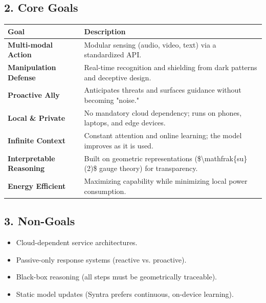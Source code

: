 \documentclass[12pt,a4paper]{article}
\providecommand{\tightlist}{\setlength{\itemsep}{0pt}\setlength{\parskip}{0pt}}
\begin{document}
\subsection{2. Core Goals}\label{core-goals}

{\def\LTcaptype{none} %
\begin{longtable}[]{@{}ll@{}}
\toprule\noalign{}
Goal & Description \\
\midrule\noalign{}
\endhead
\bottomrule\noalign{}
\endlastfoot
\textbf{Multi-modal Action} & Modular sensing (audio, video, text) via a
standardized API. \\
\textbf{Manipulation Defense} & Real-time recognition and shielding from
dark patterns and deceptive design. \\
\textbf{Proactive Ally} & Anticipates threats and surfaces guidance
without becoming "noise." \\
\textbf{Local \& Private} & No mandatory cloud dependency; runs on
phones, laptops, and edge devices. \\
\textbf{Infinite Context} & Constant attention and online learning; the
model improves as it is used. \\
\textbf{Interpretable Reasoning} & Built on geometric representations
(\$\textbackslash mathfrak\{su\}(2)\$ gauge theory) for transparency. \\
\textbf{Energy Efficient} & Maximizing capability while minimizing local
power consumption. \\
\end{longtable}
}

\subsection{3. Non-Goals}\label{non-goals}

\begin{itemize}
\tightlist
\item
  Cloud-dependent service architectures.
\item
  Passive-only response systems (reactive vs. proactive).
\item
  Black-box reasoning (all steps must be geometrically traceable).
\item
  Static model updates (Syntra prefers continuous, on-device learning).
\end{itemize}
\end{document}
